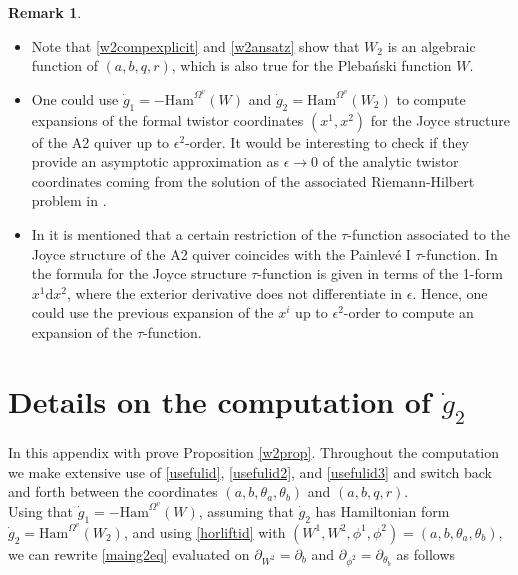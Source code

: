 \documentclass{article}
\theoremstyle{definition}
\newtheorem{remark}[theorem]{Remark}
\numberwithin{equation}{section}
\begin{document}
\begin{remark}
\begin{itemize}
\item Note that \eqref{w2compexplicit} and \eqref{w2ansatz} show that $W_2$ is an algebraic function of $(a,b,q,r)$, which is also true for the Pleba\'nski function $W$. 
\item One could use $\dot{g}_1=-\text{Ham}^{\Omega^{v}}(W)$ and $\dot{g}_2=\text{Ham}^{\Omega^{v}}(W_2)$ to compute expansions of the formal twistor coordinates $(x^1,x^2)$ for the Joyce structure of the A2 quiver up to $\epsilon^2$-order. It would be interesting to check if they provide an asymptotic approximation as $\epsilon \to 0$ of the analytic twistor coordinates coming from the solution of the associated Riemann-Hilbert problem in \cite{BridgelandOsc}.
\item In \cite[Section 8.3]{BridgelandTau} it is mentioned that a certain restriction of the $\tau$-function associated to the Joyce structure of the A2 quiver coincides with the Painlev\'e I $\tau$-function. In \cite[Equation 8.4]{BridgelandTau} the formula for the Joyce structure $\tau$-function is given in terms of the 1-form $x^1\mathrm{d}x^2$, where the exterior derivative does not differentiate in $\epsilon$. Hence, one could use the previous expansion of the $x^i$ up to $\epsilon^2$-order to compute an expansion of the $\tau$-function. 
\end{itemize}
\end{remark}

\appendix

\section{Details on the computation of $\dot{g}_2$}\label{A1}

In this appendix with prove Proposition \ref{w2prop}. Throughout the computation we make extensive use of \eqref{usefulid}, \eqref{usefulid2}, and \eqref{usefulid3} and switch back and forth between the coordinates $(a,b,\theta_a,\theta_b)$ and $(a,b,q,r)$. \\

Using that $\dot{g}_1=-\text{Ham}^{\Omega^{v}}(W)$, assuming that $\dot{g}_2$ has Hamiltonian form $\dot{g}_2=\text{Ham}^{\Omega^{v}}(W_2)$, and using \eqref{horliftid} with $(W^1,W^2,\phi^1,\phi^2)=(a,b,\theta_a,\theta_b)$, we can rewrite \eqref{maing2eq} evaluated on $\partial_{W^2}=\partial_b$ and $\partial_{\phi^2}=\partial_{\theta_b}$ as follows
\end{document}
